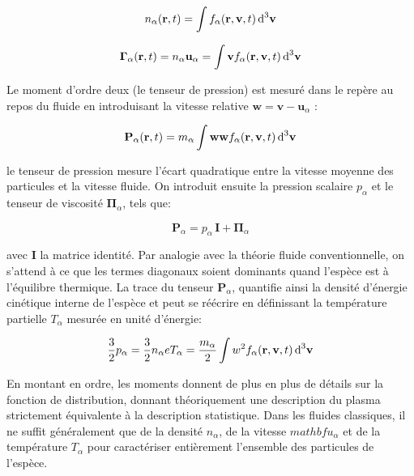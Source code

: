 \begin{refsection}
\begin{equation}
n_\alpha(\mathbf
r,t)=\int f_\alpha(\mathbf r,\mathbf v,t)
\,\text{d}^{{3}}\mathbf{v}
\end{equation}

\begin{equation}
\boldsymbol{\Gamma}_\alpha(\mathbf
r,t)=n_\alpha\mathbf u_\alpha=\int \mathbf v f_\alpha(\mathbf r,\mathbf
v,t) \,\text{d}^{{3}}\mathbf{v}
\end{equation}

Le moment d'ordre deux (le tenseur de pression) est mesuré dans le repère au
repos du fluide en introduisant la vitesse relative $\mathbf w=\mathbf
v-\mathbf u_\alpha$ : 

\begin{equation}
\mathbf P_\alpha(\mathbf
r,t)=m_\alpha\int \mathbf w\mathbf w
f_\alpha(\mathbf r,\mathbf v,t) \,\text{d}^{{3}}\mathbf{v}
\end{equation}

le tenseur de pression mesure l'écart quadratique entre la vitesse moyenne des
particules et la vitesse fluide. On introduit ensuite la
pression scalaire $p_\alpha$ et le tenseur de viscosité
$\boldsymbol{\Pi}_\alpha$, tels que:

\begin{equation}
\mathbf P_\alpha=p_\alpha\,\mathbf I + \boldsymbol{\Pi}_\alpha
\end{equation}

avec $\mathbf I$ la matrice identité. Par analogie avec la théorie fluide
conventionnelle, on s'attend à ce que les termes diagonaux soient dominants
quand l'espèce est à l'équilibre thermique. La trace du tenseur
$\mathbf P_\alpha$, quantifie ainsi la densité d'énergie cinétique
interne de l'espèce et peut se réécrire en définissant la température partielle 
$T_\alpha$ mesurée en unité d'énergie:

\begin{equation}
\frac{3}{2}p_\alpha=\frac{3}{2}n_\alpha eT_\alpha=\frac{m_\alpha}{2}\int 
w^{{2}} f_\alpha(\mathbf r,\mathbf v,t) \,\text{d}^{{3}}\mathbf{v}
\end{equation}

En montant en ordre, les moments donnent de plus en plus de détails sur la
fonction de distribution, donnant théoriquement une description du plasma
strictement équivalente à la description statistique. Dans les fluides
classiques, il ne suffit généralement que de la densité $n_\alpha$, de la
vitesse $mathbf{u}_\alpha$ et de la température $T_\alpha$ pour caractériser
entièrement l'ensemble des particules de l'espèce.


\end{refsection}
